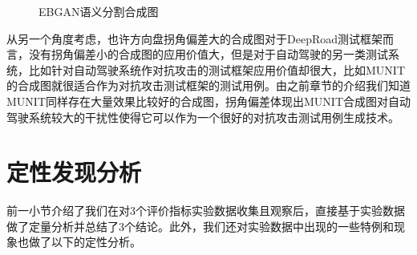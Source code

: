 \begin{enumerate}[itemindent=20pt, listparindent = 0.7cm]
    \begin{figure}[h]
        \centering
        \caption{EBGAN语义分割合成图}
        \label{fig:seg}
    \end{figure}

    从另一个角度考虑，也许方向盘拐角偏差大的合成图对于DeepRoad测试框架而言，没有拐角偏差小的合成图的应用价值大，但是对于自动驾驶的另一类测试系统，比如针对自动驾驶系统作对抗攻击的测试框架应用价值却很大，比如MUNIT的合成图就很适合作为对抗攻击测试框架的测试用例。由之前章节的介绍我们知道MUNIT同样存在大量效果比较好的合成图，拐角偏差体现出MUNIT合成图对自动驾驶系统较大的干扰性使得它可以作为一个很好的对抗攻击测试用例生成技术。　
\end{enumerate}

\section{定性发现分析}

前一小节介绍了我们在对3个评价指标实验数据收集且观察后，直接基于实验数据做了定量分析并总结了3个结论。此外，我们还对实验数据中出现的一些特例和现象也做了以下的定性分析。

